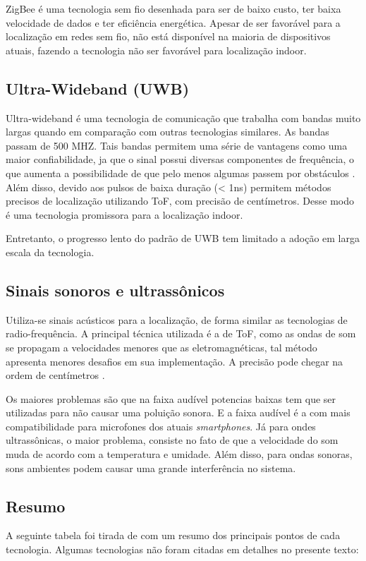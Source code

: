 ZigBee é uma tecnologia sem fio desenhada para ser de baixo custo, ter baixa velocidade de dados e ter eficiência energética. Apesar de ser favorável para a localização em redes sem fio, não está disponível na maioria de dispositivos atuais, fazendo a tecnologia não ser favorável para localização indoor. \cite{art2}

\subsection{Ultra-Wideband (UWB)}
Ultra-wideband é uma tecnologia de comunicação que trabalha com bandas muito largas quando em comparação com outras tecnologias similares. As bandas passam de 500 MHZ. Tais bandas permitem uma série de vantagens como uma maior confiabilidade, ja que o sinal possui diversas componentes de frequência, o que aumenta a possibilidade de que pelo menos algumas passem por obstáculos \cite{art10}.
Além disso, devido aos pulsos de baixa duração (< 1ns) permitem métodos precisos de localização utilizando ToF, com precisão de centímetros. Desse modo é uma tecnologia promissora para a localização indoor.

Entretanto, o progresso lento do padrão de UWB tem limitado a adoção em larga escala da tecnologia.


\subsection{Sinais sonoros e ultrassônicos}

Utiliza-se sinais acústicos para a localização, de forma similar as tecnologias de radio-frequência.
A principal técnica utilizada é a de ToF, como as ondas de som se propagam a velocidades menores que as eletromagnéticas, tal método apresenta menores desafios em sua implementação. A precisão pode chegar na ordem de centímetros \cite{art11}.

Os maiores problemas são que na faixa audível potencias baixas tem que ser utilizadas para não causar uma poluição sonora. E a faixa audível é a com mais compatibilidade para microfones dos atuais \textit{smartphones}. Já para ondes ultrassônicas, o maior problema, consiste no fato de que a velocidade do som muda de acordo com a temperatura e umidade. Além disso, para ondas sonoras, sons ambientes podem causar uma grande interferência no sistema.


\subsection{Resumo}
A seguinte tabela foi tirada de \cite{art2} com um resumo dos principais pontos de cada tecnologia. Algumas tecnologias não foram citadas em detalhes no presente texto:

